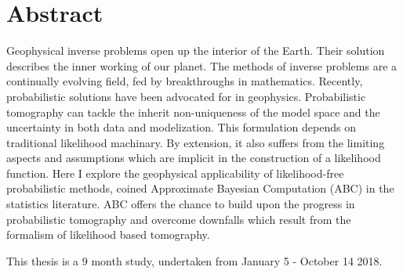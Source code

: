 \chapter{Abstract}

Geophysical inverse problems open up the interior of the Earth. Their solution describes the inner working of our planet. The methods of inverse problems are a continually evolving field, fed by breakthroughs in mathematics. Recently, probabilistic solutions have been advocated for in geophysics. Probabilistic tomography can tackle the inherit non-uniqueness of the model space and the uncertainty in both data and modelization. This formulation depends on traditional likelihood machinary. By extension, it also suffers from the limiting aspects and assumptions which are implicit in the construction of a likelihood function. Here I explore the geophysical applicability of likelihood-free probabilistic methods, coined Approximate Bayesian Computation (ABC) in the statistics literature. ABC offers the chance to build upon the progress in probabilistic tomography and overcome downfalls which result from the formalism of likelihood based tomography.\par
This thesis is a 9 month study, undertaken from January 5 - October 14 2018. 
